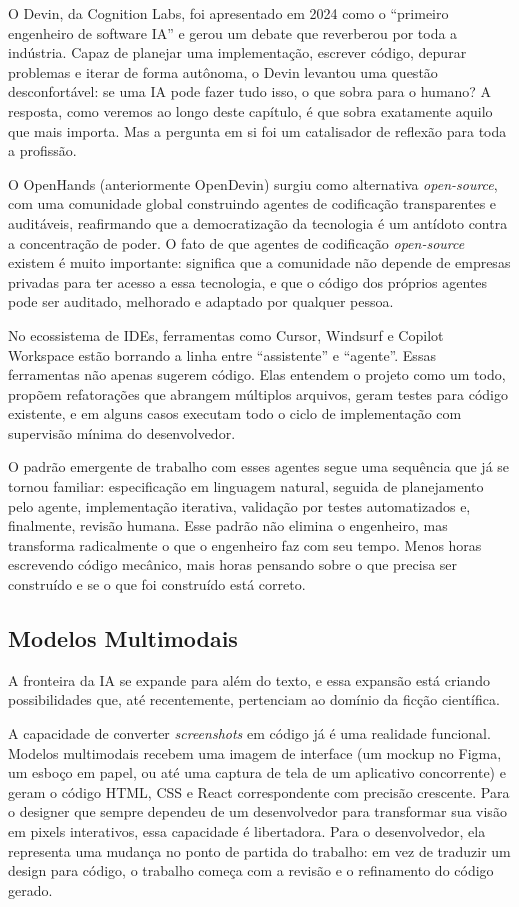 O Devin, da Cognition Labs, foi apresentado em 2024 como o ``primeiro
engenheiro de software IA'' e gerou um debate que reverberou por toda
a indústria. Capaz de planejar uma implementação, escrever código,
depurar problemas e iterar de forma autônoma, o Devin levantou uma
questão desconfortável: se uma IA pode fazer tudo isso, o que sobra
para o humano? A resposta, como veremos ao longo deste capítulo, é que
sobra exatamente aquilo que mais importa. Mas a pergunta em si foi
um catalisador de reflexão para toda a profissão.

O OpenHands (anteriormente OpenDevin) surgiu como alternativa
\textit{open-source}, com uma comunidade global construindo agentes de
codificação transparentes e auditáveis, reafirmando que a
democratização da tecnologia é um antídoto contra a concentração de
poder. O fato de que agentes de codificação \textit{open-source}
existem é muito importante: significa que a comunidade não
depende de empresas privadas para ter acesso a essa tecnologia, e que
o código dos próprios agentes pode ser auditado, melhorado e adaptado
por qualquer pessoa.

No ecossistema de IDEs, ferramentas como Cursor, Windsurf e Copilot
Workspace estão borrando a linha entre ``assistente'' e ``agente''.
Essas ferramentas não apenas sugerem código. Elas entendem o
projeto como um todo, propõem refatorações que abrangem múltiplos
arquivos, geram testes para código existente, e em alguns casos
executam todo o ciclo de implementação com supervisão mínima do
desenvolvedor.

O padrão emergente de trabalho com esses agentes segue uma sequência
que já se tornou familiar: especificação em linguagem natural, seguida
de planejamento pelo agente, implementação iterativa, validação por
testes automatizados e, finalmente, revisão humana. Esse padrão não
elimina o engenheiro, mas transforma radicalmente o que o engenheiro
faz com seu tempo. Menos horas escrevendo código mecânico, mais horas
pensando sobre o que precisa ser construído e se o que foi construído
está correto.

\subsection{Modelos Multimodais}

A fronteira da IA se expande para além do texto, e essa expansão está
criando possibilidades que, até recentemente, pertenciam ao domínio da
ficção científica.

A capacidade de converter \textit{screenshots} em código já é uma
realidade funcional. Modelos multimodais recebem uma imagem de
interface (um mockup no Figma, um esboço em papel, ou até uma
captura de tela de um aplicativo concorrente) e geram o código HTML,
CSS e React correspondente com precisão crescente. Para o designer que
sempre dependeu de um desenvolvedor para transformar sua visão em
pixels interativos, essa capacidade é libertadora. Para o desenvolvedor,
ela representa uma mudança no ponto de partida do trabalho: em vez de
traduzir um design para código, o trabalho começa com a revisão e o
refinamento do código gerado.

